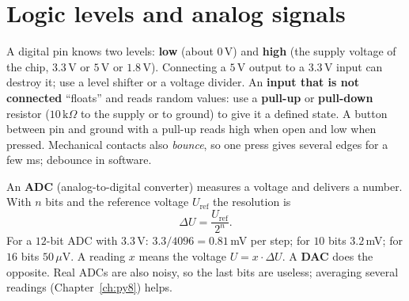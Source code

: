 \section*{Logic levels and analog signals}
A digital pin knows two levels: \textbf{low} (about $0$\,V) and \textbf{high} (the supply voltage of the chip, $3.3$\,V or $5$\,V or $1.8$\,V). Connecting a $5$\,V output to a $3.3$\,V input can destroy it; use a level shifter or a voltage divider. An \textbf{input that is not connected} ``floats'' and reads random values: use a \textbf{pull-up} or \textbf{pull-down} resistor ($10\,\text{k}\Omega$ to the supply or to ground) to give it a defined state. A button between pin and ground with a pull-up reads high when open and low when pressed. Mechanical contacts also \emph{bounce}, so one press gives several edges for a few ms; debounce in software.

An \textbf{ADC} (analog-to-digital converter) measures a voltage and delivers a number. With $n$ bits and the reference voltage $U_\text{ref}$ the resolution is
\[
\Delta U=\frac{U_\text{ref}}{2^{n}}.
\]
For a $12$-bit ADC with $3.3$\,V: $3.3/4096=0.81$\,mV per step; for $10$ bits $3.2$\,mV; for $16$ bits $50\,\mu$V. A reading $x$ means the voltage $U=x\cdot\Delta U$. A \textbf{DAC} does the opposite. Real ADCs are also noisy, so the last bits are useless; averaging several readings (Chapter~\ref{ch:py8}) helps.

